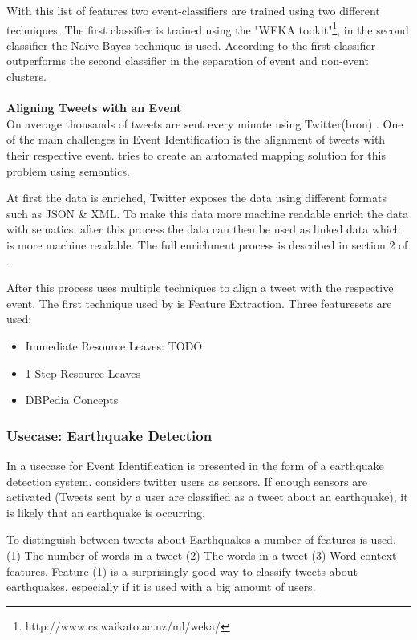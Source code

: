 \documentclass{article}
\begin{document}
With this list of features two event-classifiers are trained using two different techniques. The first classifier is trained using the "WEKA tookit"\footnote{http://www.cs.waikato.ac.nz/ml/weka/}, in the second classifier the  Naive-Bayes technique is used. According to \cite{eventident} the first classifier outperforms the second classifier in the separation of event and non-event clusters. 
\\\\
\textbf{Aligning Tweets with an Event} \\
On average thousands of tweets are sent every minute using Twitter(bron) . One of the main challenges in Event Identification is the alignment of tweets with their respective event. \cite{eventalign} tries to create an automated mapping solution for this problem using semantics.

At first the data is enriched, Twitter exposes the data using different formats such as JSON \& XML. To make this data more machine readable \cite{eventalign} enrich the data with sematics, after this process the data can then  be used as linked data which is more machine readable. The full enrichment process is described in section 2 of \cite{eventalign}.

After this process \cite{eventalign} uses multiple techniques to align a tweet with the respective event. The first technique used by \cite{eventalign} is Feature Extraction. Three featuresets are used:
\begin{itemize}
  \item Immediate Resource Leaves: TODO
  \item 1-Step Resource Leaves 
  \item DBPedia Concepts 
\end{itemize}

\subsubsection{Usecase: Earthquake Detection}
In \cite{earthq} a usecase for Event Identification is presented in the form of a earthquake detection system. \cite{earthq} considers twitter users as sensors. If enough sensors are activated (Tweets sent by a user are classified as a tweet about an earthquake), it is likely that an earthquake is occurring. 

To distinguish between tweets about Earthquakes a number of features is used. (1) The number of words in a tweet (2) The words in a tweet (3) Word context features. Feature (1) is a surprisingly good way to classify tweets about earthquakes, especially if it is used with a big amount of users. 
\end{document}
